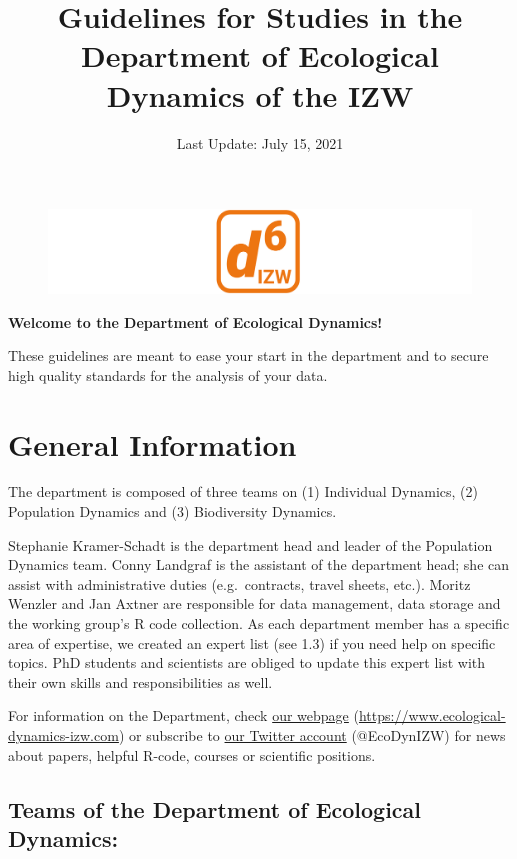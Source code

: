 \documentclass[
  english,
]{article}
\title{Guidelines for Studies in the Department of Ecological Dynamics
of the IZW}
\author{}
\date{\vspace{-2.5em}Last Update: July 15, 2021}
\begin{document}
\maketitle

\begin{figure}
\includegraphics[width=1\linewidth]{./src/d6_white} \end{figure}

\textbf{Welcome to the Department of Ecological Dynamics!}

These guidelines are meant to ease your start in the department and to
secure high quality standards for the analysis of your data.

\newpage

\hypertarget{general-information}{%
\section{General Information}\label{general-information}}

The department is composed of three teams on (1) Individual Dynamics,
(2) Population Dynamics and (3) Biodiversity Dynamics.

Stephanie Kramer-Schadt is the department head and leader of the
Population Dynamics team. Conny Landgraf is the assistant of the
department head; she can assist with administrative duties
(e.g.~contracts, travel sheets, etc.). Moritz Wenzler and Jan Axtner are
responsible for data management, data storage and the working group's R
code collection. As each department member has a specific area of
expertise, we created an expert list (see 1.3) if you need help on
specific topics. PhD students and scientists are obliged to update this
expert list with their own skills and responsibilities as well.

For information on the Department, check
\href{https://www.ecological-dynamics-izw.com}{our webpage}
(\url{https://www.ecological-dynamics-izw.com}) or subscribe to
\href{https://www.twitter.com/EcoDynIZW}{our Twitter account}
(@EcoDynIZW) for news about papers, helpful R-code, courses or
scientific positions.

\hypertarget{teams-of-the-department-of-ecological-dynamics}{%
\subsection{Teams of the Department of Ecological
Dynamics:}\label{teams-of-the-department-of-ecological-dynamics}}
\end{document}
